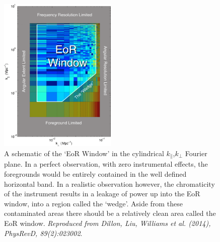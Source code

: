 \begin{figure}
\begin{center}
    \includegraphics[width=0.5\textwidth]{Chapman_Jelic/Images/medium.png}
\end{center}
    \caption{A schematic of the `EoR Window' in the cylindrical $k_{\parallel}$,$k_{\perp}$ Fourier plane. In a perfect observation, with zero instrumental effects, the foregrounds would be entirely contained in the well defined horizontal band. In a realistic observation however, the chromaticity of the instrument results in a leakage of power up into the EoR window, into a region called the `wedge'. Aside from these contaminated areas there should be a relatively clean area called the EoR window. \textit{Reproduced from Dillon, Liu, Williams et al. (2014), PhysRevD, 89(2):023002}.}
    \label{fig:window_liu}
\end{figure}

